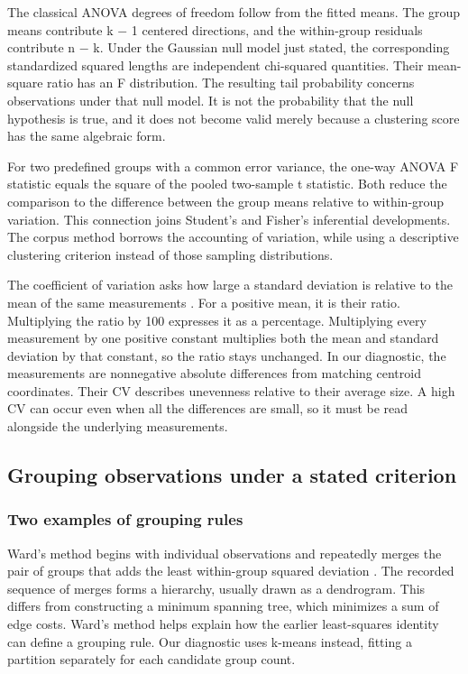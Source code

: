 \documentclass[10pt,letterpaper]{article}
\begin{document}
The classical ANOVA degrees of freedom follow from the fitted means. The group means contribute k \ensuremath{-} 1 centered directions, and the within-group residuals contribute n \ensuremath{-} k. Under the Gaussian null model just stated, the corresponding standardized squared lengths are independent chi-squared quantities. Their mean-square ratio has an F distribution. The resulting tail probability concerns observations under that null model. It is not the probability that the null hypothesis is true, and it does not become valid merely because a clustering score has the same algebraic form.\par

For two predefined groups with a common error variance, the one-way ANOVA F statistic equals the square of the pooled two-sample t statistic. Both reduce the comparison to the difference between the group means relative to within-group variation. This connection joins Student's and Fisher's inferential developments. The corpus method borrows the accounting of variation, while using a descriptive clustering criterion instead of those sampling distributions.\par

The coefficient of variation asks how large a standard deviation is relative to the mean of the same measurements \cite{nistcv}. For a positive mean, it is their ratio. Multiplying the ratio by 100 expresses it as a percentage. Multiplying every measurement by one positive constant multiplies both the mean and standard deviation by that constant, so the ratio stays unchanged. In our diagnostic, the measurements are nonnegative absolute differences from matching centroid coordinates. Their CV describes unevenness relative to their average size. A high CV can occur even when all the differences are small, so it must be read alongside the underlying measurements.\par

\subsection{Grouping observations under a stated criterion}
\subsubsection{Two examples of grouping rules}
Ward's method begins with individual observations and repeatedly merges the pair of groups that adds the least within-group squared deviation \cite{ward}. The recorded sequence of merges forms a hierarchy, usually drawn as a dendrogram. This differs from constructing a minimum spanning tree, which minimizes a sum of edge costs. Ward's method helps explain how the earlier least-squares identity can define a grouping rule. Our diagnostic uses k-means instead, fitting a partition separately for each candidate group count.\par
\end{document}
